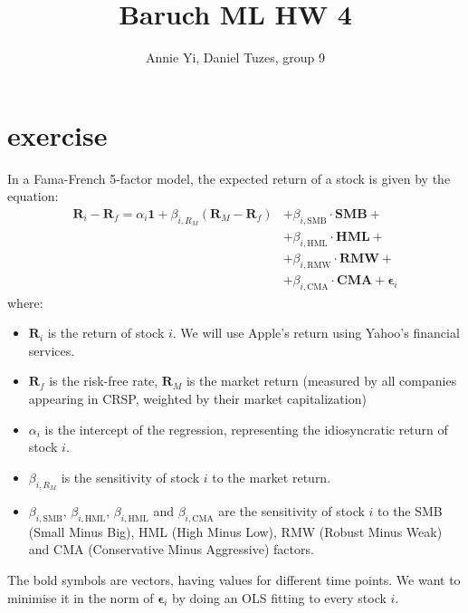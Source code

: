 \documentclass{article}
\title{Baruch ML HW 4}
\author{Annie Yi, Daniel Tuzes, group 9}
\begin{document}
\maketitle
\section{exercise}
In a Fama-French 5-factor model, the expected return of a stock is given by the equation:
\begin{align*}
    \mathbf R_i - \mathbf R_f = \alpha_i \mathbf 1+ \beta_{i,R_M} (\mathbf R_M - \mathbf R_f) & + \beta_{i,\text{SMB}} \cdot \mathbf{SMB} +                    \\
                                                                                              & + \beta_{i,\text{HML}} \cdot \mathbf{HML} +                    \\
                                                                                              & + \beta_{i,\text{RMW}} \cdot \mathbf{RMW} +                    \\
                                                                                              & + \beta_{i,\text{CMA}} \cdot \mathbf{CMA} + \mathbf \epsilon_i
\end{align*}
where:

\begin{itemize}
    \item $\mathbf R_i$ is the return of stock $i$. We will use Apple's return using Yahoo's financial services.
    \item $\mathbf R_f$ is the risk-free rate, $\mathbf R_M$ is the market return
          (measured by all companies appearing in CRSP, weighted by their market capitalization)
    \item $\alpha_i$ is the intercept of the regression, representing the idiosyncratic return of stock $i$.
    \item $\beta_{i,R_M}$ is the sensitivity of stock $i$ to the market return.
    \item $\beta_{i,\text{SMB}}$, $\beta_{i,\text{HML}}$, $\beta_{i,\text{HML}}$ and $\beta_{i,\text{CMA}}$
          are the sensitivity of stock $i$ to the
          SMB (Small Minus Big),
          HML (High Minus Low),
          RMW (Robust Minus Weak) and
          CMA (Conservative Minus Aggressive) factors.
\end{itemize}
The bold symbols are vectors, having values for different time points.
We want to minimise it in the norm of $\mathbf \epsilon_i$ by
doing an OLS fitting to every stock $i$.
\end{document}
